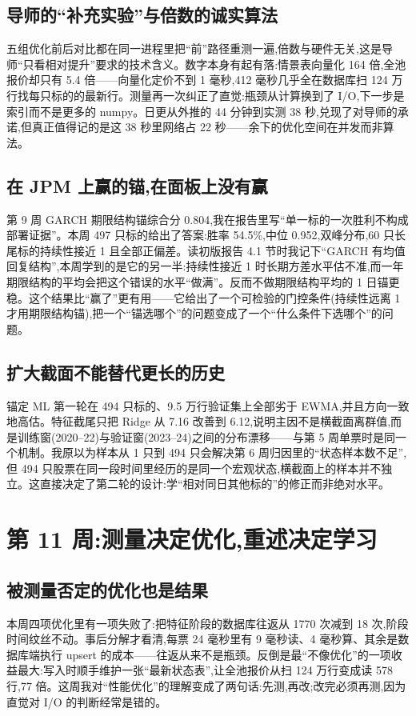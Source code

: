 \documentclass[11pt]{ctexart}
\begin{document}
\subsection{导师的“补充实验”与倍数的诚实算法}
五组优化前后对比都在同一进程里把“前”路径重测一遍,倍数与硬件无关,这是导师“只看相对提升”要求的技术含义。数字本身有起有落:情景表向量化 164 倍,全池报价却只有 5.4 倍——向量化定价不到 1 毫秒,412 毫秒几乎全在数据库扫 124 万行找每只标的的最新行。测量再一次纠正了直觉:瓶颈从计算换到了 I/O,下一步是索引而不是更多的 numpy。日更从外推的 44 分钟到实测 38 秒,兑现了对导师的承诺,但真正值得记的是这 38 秒里网络占 22 秒——余下的优化空间在并发而非算法。

\subsection{在 JPM 上赢的锚,在面板上没有赢}
第 9 周 GARCH 期限结构锚综合分 0.804,我在报告里写“单一标的一次胜利不构成部署证据”。本周 497 只标的给出了答案:胜率 54.5\%,中位 0.952,双峰分布,60 只长尾标的持续性接近 1 且全部正偏差。读初版报告 4.1 节时我记下“GARCH 有均值回复结构”,本周学到的是它的另一半:持续性接近 1 时长期方差水平估不准,而一年期限结构的平均会把这个错误的水平“做满”。反而不做期限结构平均的 1 日锚更稳。这个结果比“赢了”更有用——它给出了一个可检验的门控条件(持续性远离 1 才用期限结构锚),把一个“锚选哪个”的问题变成了一个“什么条件下选哪个”的问题。

\subsection{扩大截面不能替代更长的历史}
锚定 ML 第一轮在 494 只标的、9.5 万行验证集上全部劣于 EWMA,并且方向一致地高估。特征截尾只把 Ridge 从 7.16 改善到 6.12,说明主因不是横截面离群值,而是训练窗(2020--22)与验证窗(2023--24)之间的分布漂移——与第 5 周单票时是同一个机制。我原以为样本从 1 只到 494 只会解决第 6 周归因里的“状态样本数不足”,但 494 只股票在同一段时间里经历的是同一个宏观状态,横截面上的样本并不独立。这直接决定了第二轮的设计:学“相对同日其他标的”的修正而非绝对水平。

\section{第 11 周:测量决定优化,重述决定学习}

\subsection{被测量否定的优化也是结果}
本周四项优化里有一项失败了:把特征阶段的数据库往返从 1770 次减到 18 次,阶段时间纹丝不动。事后分解才看清,每票 24 毫秒里有 9 毫秒读、4 毫秒算、其余是数据库端执行 upsert 的成本——往返从来不是瓶颈。反倒是最“不像优化”的一项收益最大:写入时顺手维护一张“最新状态表”,让全池报价从扫 124 万行变成读 578 行,77 倍。这周我对“性能优化”的理解变成了两句话:先测,再改;改完必须再测,因为直觉对 I/O 的判断经常是错的。
\end{document}
